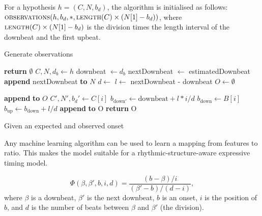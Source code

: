 For a hypothesis $h = (C, N, b_d)$, the algorithm is initialised as follows: $\textsc{observations}(h, b_d, *, \textsc{length}(C) \times (N[1] - b_d))$, where $\textsc{length}(C) \times (N[1] - b_d)$ is the division times the length interval of the downbeat and the first upbeat.
\begin{algorithm}
\caption{Generate observations}
\label{alg:observations}
\begin{algorithmic}
		\State \textbf{return} $\emptyset$
	\EndIf
	\State $C, N, d_b \leftarrow h$
		\State downbeat $\leftarrow d_b$
	\EndIf
		\State nextDownbeat $\leftarrow$ estimatedDownbeat
	\EndIf
	\State \textbf{append} nextDownbeat \textbf{to} $N$
	\State $d \leftarrow$ 
	\State $l \leftarrow$ nextDownbeat - downbeat
	\State $O \leftarrow \emptyset$

			\State \textbf{append}  \textbf{to} $O$
		\EndIf	
		\State $C', N', b_d' \leftarrow C[i]$
			\State $b_{\mathrm{down}'} \leftarrow \mathrm{downbeat} + l * i/d$
				\State $b_{\mathrm{down}} \leftarrow B[i]$
			\EndIf
			\State $b_{\mathrm{up}} \leftarrow b_{\mathrm{down}} + l/d$
			\State \textbf{append}  \textbf{to} O
		\EndIf
	\EndFor
	\State \textbf{return} O
\EndFunction
\end{algorithmic}
\end{algorithm}

Given an expected and observed onset

Any machine learning algorithm can be used to learn a mapping from features to ratio. This makes the model suitable for a rhythmic-structure-aware expressive timing model.


\begin{equation}
\Phi(\beta, \beta', b, i, d) = \frac{(b - \beta) / i}{(\beta' - b) / (d - i)},
\end{equation}
where $\beta$ is a downbeat, $\beta'$ is the next downbeat, $b$ is an onset, $i$ is the position of $b$, and $d$ is the number of beats between $\beta$ and $\beta'$ (the division).


